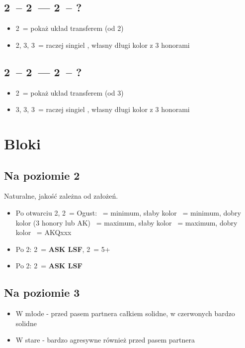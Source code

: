 \documentclass[12pt, a4paper]{article}
\newcommand{\lsf}{\color{WildStrawberry}\textbf{ASK LSF}\color{black}}
\begin{document}
\subsection*{2\clubs\ -- 2\diams\ --- 2\hearts\ -- ?}
\begin{itemize}
    \item 2\spades\ = pokaż układ transferem (od 2\nt)
    \item 2\nt, 3\clubs, 3\diams\ = raczej singiel \hearts, własny długi kolor z 3 honorami
\end{itemize}

\subsection*{2\clubs\ -- 2\diams\ --- 2\spades\ -- ?}
\begin{itemize}
    \item 2\nt\ = pokaż układ transferem (od 3\clubs)
    \item 3\clubs, 3\diams, 3\hearts\ = raczej singiel \spades, własny długi kolor z 3 honorami
\end{itemize}



\pagebreak
\section{Bloki}
\subsection*{Na poziomie 2}
Naturalne, jakość zależna od założeń.
\begin{itemize}
    \item Po otwarciu 2\diams, 2\nt\ = Ogust:
    \clubs\ = minimum, słaby kolor
    \diams\ = minimum, dobry kolor (3 honory lub AK)
    \hearts\ = maximum, słaby kolor
    \spades\ = maximum, dobry kolor
    \nt\ = AKQxxx
    \item Po 2\hearts: 2\spades\ = \lsf, 2\nt\ = 5+\spades\ \fonce
    \item Po 2\spades: 2\nt\ = \lsf
\end{itemize}

\subsection*{Na poziomie 3}
\begin{itemize}
    \item W młode - przed pasem partnera całkiem solidne, w czerwonych bardzo solidne
    \item W stare - bardzo agresywne również przed pasem partnera
\end{itemize}
\end{document}
